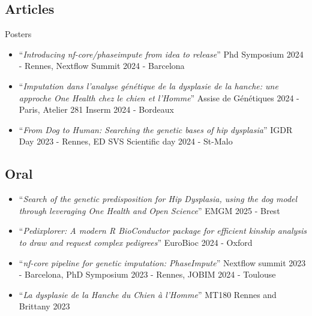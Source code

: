 \documentclass[10pt,a4paper]{moderncv}
\begin{document}
\vspace{0.5cm}

\subsection{Articles}
\begingroup
\nocite{*}
\renewcommand{\section}[2]{}%
\printbibliography
\endgroup

\clearpage

\section{Presentations}
    \subsection{Posters}
        \begin{itemize}
            \item \enquote{\textit{Introducing nf-core/phaseimpute from idea to release}}
            Phd Symposium 2024 - Rennes, Nextflow Summit 2024 - Barcelona
            \item \enquote{\textit{Imputation dans l'analyse génétique de la dysplasie de la hanche: une approche One Health chez le chien et l'Homme}}
            Assise de Génétiques 2024 - Paris, Atelier 281 Inserm 2024 - Bordeaux
            \item \enquote{\textit{From Dog to Human: Searching the genetic bases of hip dysplasia}}
            IGDR Day 2023 - Rennes, ED SVS Scientific day 2024 - St-Malo
        \end{itemize}
    \subsection{Oral}
        \begin{itemize}
            \item \enquote{\textit{Search of the genetic predisposition for Hip Dysplasia, using the dog model through leveraging One Health and Open Science}}
            EMGM 2025 - Brest
            \item \enquote{\textit{Pedixplorer: A modern R BioConductor package for efficient kinship analysis to draw and request complex pedigrees}}
            EuroBioc 2024 - Oxford
            \item \enquote{\textit{nf-core pipeline for genetic imputation: PhaseImpute}}
            Nextflow summit 2023 - Barcelona, PhD Symposium 2023 - Rennes, JOBIM 2024 - Toulouse
            \item \enquote{\textit{La dysplasie de la Hanche du Chien à l'Homme}}
            MT180 Rennes and Brittany 2023
        \end{itemize}
\end{document}
